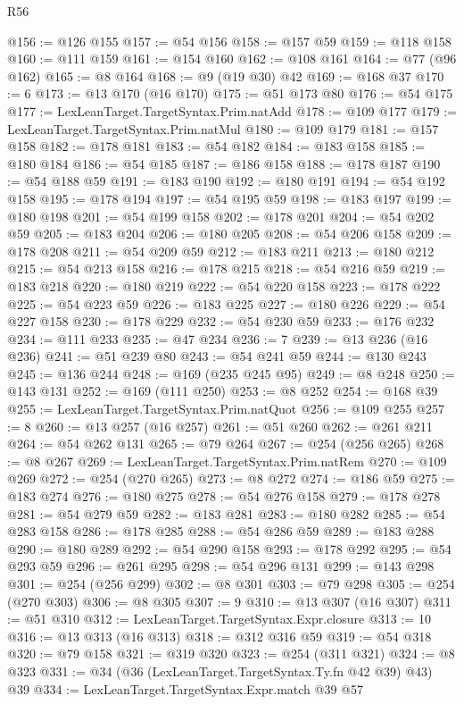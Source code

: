 \begin{lexlean}{R56}
\begin{coremodule}
@156 := @126 @155
@157 := @54 @156
@158 := @157 @59
@159 := @118 @158
@160 := @111 @159
@161 := @154 @160
@162 := @108 @161
@164 := @77 (@96 @162)
@165 := @8 @164
@168 := @9 (@19 @30) @42
@169 := @168 @37
@170 := 6
@173 := @13 @170 (@16 @170)
@175 := @51 @173 @80
@176 := @54 @175
@177 := LexLeanTarget.TargetSyntax.Prim.natAdd
@178 := @109 @177
@179 := LexLeanTarget.TargetSyntax.Prim.natMul
@180 := @109 @179
@181 := @157 @158
@182 := @178 @181
@183 := @54 @182
@184 := @183 @158
@185 := @180 @184
@186 := @54 @185
@187 := @186 @158
@188 := @178 @187
@190 := @54 @188 @59
@191 := @183 @190
@192 := @180 @191
@194 := @54 @192 @158
@195 := @178 @194
@197 := @54 @195 @59
@198 := @183 @197
@199 := @180 @198
@201 := @54 @199 @158
@202 := @178 @201
@204 := @54 @202 @59
@205 := @183 @204
@206 := @180 @205
@208 := @54 @206 @158
@209 := @178 @208
@211 := @54 @209 @59
@212 := @183 @211
@213 := @180 @212
@215 := @54 @213 @158
@216 := @178 @215
@218 := @54 @216 @59
@219 := @183 @218
@220 := @180 @219
@222 := @54 @220 @158
@223 := @178 @222
@225 := @54 @223 @59
@226 := @183 @225
@227 := @180 @226
@229 := @54 @227 @158
@230 := @178 @229
@232 := @54 @230 @59
@233 := @176 @232
@234 := @111 @233
@235 := @47 @234
@236 := 7
@239 := @13 @236 (@16 @236)
@241 := @51 @239 @80
@243 := @54 @241 @59
@244 := @130 @243
@245 := @136 @244
@248 := @169 (@235 @245 @95)
@249 := @8 @248
@250 := @143 @131
@252 := @169 (@111 @250)
@253 := @8 @252
@254 := @168 @39
@255 := LexLeanTarget.TargetSyntax.Prim.natQuot
@256 := @109 @255
@257 := 8
@260 := @13 @257 (@16 @257)
@261 := @51 @260
@262 := @261 @211
@264 := @54 @262 @131
@265 := @79 @264
@267 := @254 (@256 @265)
@268 := @8 @267
@269 := LexLeanTarget.TargetSyntax.Prim.natRem
@270 := @109 @269
@272 := @254 (@270 @265)
@273 := @8 @272
@274 := @186 @59
@275 := @183 @274
@276 := @180 @275
@278 := @54 @276 @158
@279 := @178 @278
@281 := @54 @279 @59
@282 := @183 @281
@283 := @180 @282
@285 := @54 @283 @158
@286 := @178 @285
@288 := @54 @286 @59
@289 := @183 @288
@290 := @180 @289
@292 := @54 @290 @158
@293 := @178 @292
@295 := @54 @293 @59
@296 := @261 @295
@298 := @54 @296 @131
@299 := @143 @298
@301 := @254 (@256 @299)
@302 := @8 @301
@303 := @79 @298
@305 := @254 (@270 @303)
@306 := @8 @305
@307 := 9
@310 := @13 @307 (@16 @307)
@311 := @51 @310
@312 := LexLeanTarget.TargetSyntax.Expr.closure
@313 := 10
@316 := @13 @313 (@16 @313)
@318 := @312 @316 @59
@319 := @54 @318
@320 := @79 @158
@321 := @319 @320
@323 := @254 (@311 @321)
@324 := @8 @323
@331 := @34 (@36 (LexLeanTarget.TargetSyntax.Ty.fn @42 @39) @43) @39
@334 := LexLeanTarget.TargetSyntax.Expr.match @39 @57

\end{coremodule}
\end{lexlean}
